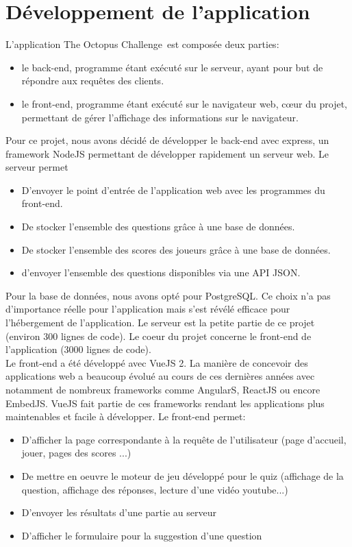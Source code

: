 \documentclass[a4paper,11pt, oneside]{book}
\def\appName{The Octopus Challenge}
\begin{document}
\section{Développement de l'application}

L'application \appName \ est composée deux parties:
\begin{itemize}
	\item le back-end, programme étant exécuté sur le serveur, ayant pour but de répondre aux requêtes des clients.
	\item le front-end, programme étant exécuté sur le navigateur web, cœur du projet, permettant de gérer l'affichage des informations sur le navigateur.\\
\end{itemize}


\noindent Pour ce projet, nous avons décidé de développer le back-end avec express, un framework NodeJS permettant de développer rapidement un serveur web. Le serveur permet
\begin{itemize}
	\item D'envoyer le point d'entrée de l'application web avec les programmes du front-end.
	\item De stocker l'ensemble des questions grâce à une base de données.
	\item De stocker l'ensemble des scores des joueurs grâce à une base de données.
	\item d'envoyer l'ensemble des questions disponibles via une API JSON.\\
\end{itemize}

\noindent Pour la base de données, nous avons opté pour PostgreSQL. Ce choix n'a pas d'importance réelle pour l'application mais s'est révélé efficace pour l'hébergement de l'application.
Le serveur est la petite partie de ce projet (environ 300 lignes de code). Le coeur du projet concerne le front-end de l'application (3000 lignes de code).\\

Le front-end a été développé avec VueJS 2. La manière de concevoir des applications web a beaucoup évolué au cours de ces dernières années avec notamment de nombreux frameworks comme AngularS, ReactJS ou encore EmbedJS. VueJS fait partie
de ces frameworks rendant les applications plus maintenables et facile à développer. Le front-end permet:
\begin{itemize}
		\item D'afficher la page correspondante à la requête de l'utilisateur (page d'accueil, jouer, pages des scores ...)
		\item De mettre en oeuvre le moteur de jeu développé pour le quiz (affichage de la question, affichage des réponses, lecture d'une vidéo youtube...)
		\item D'envoyer les résultats d'une partie au serveur
		\item D'afficher le formulaire pour la suggestion d'une question
\end{itemize}
\end{document}
